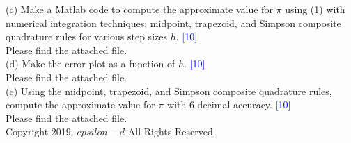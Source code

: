 \documentclass{article}
\begin{document}
(c) Make a Matlab code to compute the approximate value for $\pi$ using (1) with numerical
integration techniques; midpoint, trapezoid, and Simpson composite quadrature rules for
various step sizes $h$. \textcolor{blue}{[10]} \\

Please find the attached file.\\

(d) Make the error plot as a function of $h$. \textcolor{blue}{[10]} \\

Please find the attached file.\\

(e) Using the midpoint, trapezoid, and Simpson composite quadrature rules, compute the
approximate value for $\pi$ with 6 decimal accuracy. \textcolor{blue}{[10]} \\

Please find the attached file.\\

\normalsize Copyright 2019. $epsilon-d$ All Rights Reserved.
\end{document}
